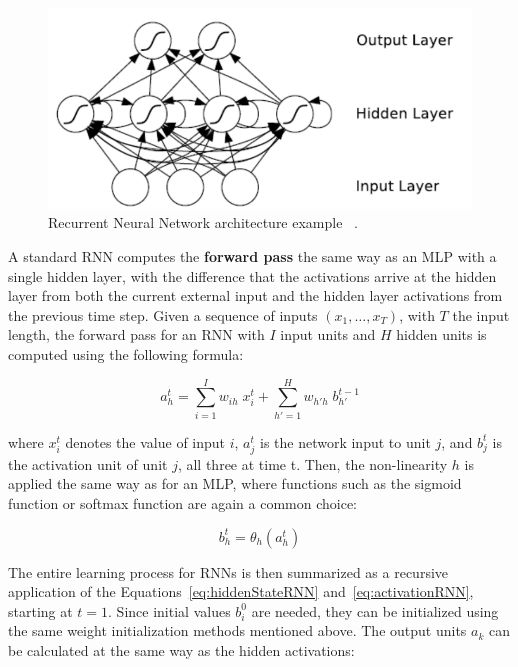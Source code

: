 \begin{figure}[!h]
    \centering
    \includegraphics[scale=.45]{imagenes/appendices/appendix_a/rnnModel.PNG}
    \caption{Recurrent Neural Network architecture example~\cite{seqlab:Graves2012-385} .}
    \label{fig:recurrentNN}
\end{figure}

A standard RNN computes the \textbf{forward pass} the same way as an MLP with a single hidden 
layer, with the difference that the activations arrive at the hidden layer from both the 
current external input and the hidden layer activations from the previous time step. Given a 
sequence of inputs $(x_1,\ldots,x_T)$, with $T$ the input length, the forward pass for an RNN 
with $I$ input units and $H$ hidden units is computed using the following formula:

\begin{equation} \label{eq:hiddenStateRNN}
    a_h^t = \sum_{i=1}^I w_{ih} \; x_i^t + \sum_{h'=1}^H w_{h'h} \; b_{h'}^{t-1}	
\end{equation}

where $x_i^t$ denotes the value of input $i$, $a_j^t$ is the network input to unit $j$, and 
$b_j^t$ is the activation unit of unit $j$, all three at time t. Then, the non-linearity $h$ 
is applied the same way as for an MLP, where functions such as the sigmoid function or 
softmax function are again a common choice:

\begin{equation} \label{eq:activationRNN}
    b_h^t = \theta_h(a_h^t)
\end{equation}

The entire learning process for RNNs is then summarized as a recursive application of the 
Equations~\ref{eq:hiddenStateRNN} and~\ref{eq:activationRNN}, starting at $t=1$. Since 
initial values $b_i^0$ are needed, they can be initialized using the same weight 
initialization methods mentioned above. The output units $a_k$ can be calculated at the same way 
as the hidden activations:

